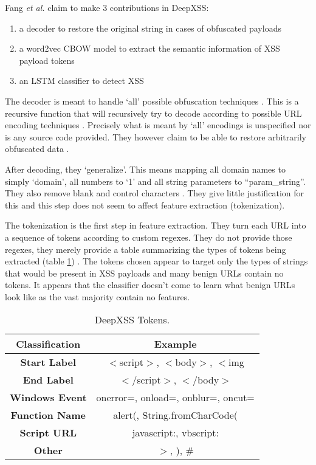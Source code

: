 Fang \textit{et al.} claim to make 3 contributions in DeepXSS:

\begin{enumerate}
\item a decoder to restore the original string in cases of obfuscated payloads
\item a word2vec CBOW model to extract the semantic information of XSS payload tokens
\item an LSTM classifier to detect XSS
\end{enumerate}

The decoder is meant to handle `all' possible obfuscation techniques \cite{fang2018deepxss}. This is a recursive function that will recursively try to decode according to possible URL encoding techniques \cite{xsscheat}. Precisely what is meant by `all' encodings is unspecified nor is any source code provided. They however claim to be able to restore arbitrarily obfuscated data \cite{fang2018deepxss}.

After decoding, they `generalize'. This means mapping all domain names to simply `domain', all numbers to `1' and all string parameters to ``param\_string''. They also remove blank and control characters \cite{fang2018deepxss}. They give little justification for this and this step does not seem to affect feature extraction (tokenization). 

The tokenization is the first step in feature extraction. They turn each URL into a sequence of tokens according to custom regexes. They do not provide those regexes, they merely provide a table summarizing the types of tokens being extracted (table \ref{tok:tab}) \cite{fang2018deepxss}. The tokens chosen appear to target only the types of strings that would be present in XSS payloads and many benign URLs contain no tokens. It appears that the classifier doesn't come to learn what benign URLs look like as the vast majority contain no features. 

\begin{table}
\begin{center}
\begingroup
\setlength{\tabcolsep}{5pt} %
\renewcommand{\arraystretch}{1.5} %
\begin{tabular}{||c | c||} 
    \hline
    Classification & Example \\ [0.5ex] 
    \hline\hline
    \textbf{Start Label} &  $<$script$>$, $<$body$>$, $<$img \\ 
    \hline
    \textbf{End Label} & $</$script$>$, $</$body$>$ \\
    \hline
    \textbf{Windows Event} & onerror=, onload=, onblur=, oncut= \\
    \hline
    \textbf{Function Name} & alert(, String.fromCharCode( \\
    \hline
    \textbf{Script URL} & javascript:, vbscript: \\ 
    \hline
    \textbf{Other} & $>$, ), \# \\ [1ex] 
    \hline
\end{tabular}
\endgroup
\caption{\label{tok:tab}DeepXSS Tokens.}
\end{center}
\end{table}

